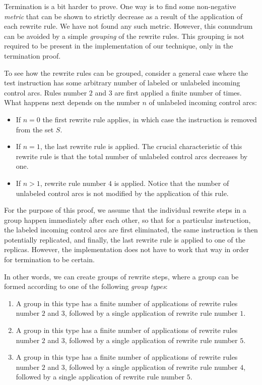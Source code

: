 Termination is a bit harder to prove.  One way is to find some
non-negative \emph{metric} that can be shown to strictly decrease as a
result of the application of each rewrite rule.  We have not found any
such metric.  However, this conundrum can be avoided by a simple
\emph{grouping} of the rewrite rules.  This grouping is not required
to be present in the implementation of our technique, only in the
termination proof.

To see how the rewrite rules can be grouped, consider a general case
where the test instruction has some arbitrary number of labeled or
unlabeled incoming control arcs.  Rules number $2$ and $3$ are first
applied a finite number of times.  What happens next depends on the
number $n$ of unlabeled incoming control arcs:

\begin{itemize}
\item If $n=0$ the first rewrite
rule applies, in which case the instruction is removed from the set
$S$.
\item If $n=1$, the last rewrite rule is applied.  The crucial
  characteristic of this rewrite rule is that the total number of
  unlabeled control arcs decreases by one.
\item If $n>1$, rewrite rule number $4$ is applied.  Notice that the
  number of unlabeled control arcs is not modified by the application of
  this rule.
\end{itemize}

For the purpose of this proof, we assume that the individual rewrite
steps in a group happen immediately after each other, so that for a
particular instruction, the labeled incoming control arcs are first
eliminated, the same instruction is then potentially replicated, and
finally, the last rewrite rule is applied to one of the replicas.
However, the implementation does not have to work that way in order
for termination to be certain.

In other words, we can create groups of rewrite steps, where a group
can be formed according to one of the following \emph{group types}:

\begin{enumerate}
\item A group in this type has a finite number of applications of
  rewrite rules number $2$ and $3$, followed by a single application
  of rewrite rule number $1$.
\item A group in this type has a finite number of applications of
  rewrite rules number $2$ and $3$, followed by a single application
  of rewrite rule number $5$.
\item A group in this type has a finite number of applications of
  rewrite rules number $2$ and $3$, followed by a single application
  of rewrite rule number $4$, followed by a single application of
  rewrite rule number $5$.
\end{enumerate}

